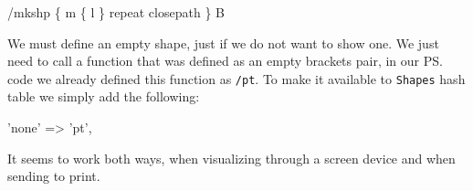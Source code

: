 \documentclass[11pt]{article}
\def\nwendcode{\endtrivlist \endgroup} %
\let\nwdocspar=\par                    %
\begin{document}
\nwenddocs{}\endmoddef
/mkshp \{    %
  m         %
  \{         %
    l       %
  \} repeat  %
  closepath %
\} B         %
\eatline
{}\nwendcode{}\nwdocspar
We must define an empty shape, just if we do not want to show one. We just need to call a function that was defined as an empty brackets pair, in our {\ps} code we already defined this function as {\tt{}/pt}. To make it available to {\tt{}{}Shapes} hash table we simply add the following:

\nwenddocs{}\endmoddef
'none'                 => 'pt',
\nwendcode{}\nwdocspar

It seems to work both ways, when visualizing through a screen device and when sending to print.


\end{document}
